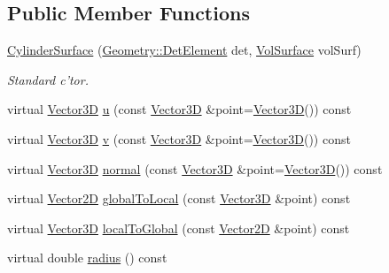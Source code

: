 \subsection*{Public Member Functions}
\begin{DoxyCompactItemize}
\item 
\hyperlink{class_d_d4hep_1_1_d_d_rec_1_1_cylinder_surface_a7820d49bdd82fe0e4c33dfa3953cd73a}{CylinderSurface} (\hyperlink{class_d_d4hep_1_1_geometry_1_1_det_element}{Geometry::DetElement} det, \hyperlink{class_d_d4hep_1_1_d_d_rec_1_1_vol_surface}{VolSurface} volSurf)
\begin{DoxyCompactList}\small\item\em Standard c'tor. \item\end{DoxyCompactList}\item 
virtual \hyperlink{class_d_d_surfaces_1_1_vector3_d}{Vector3D} \hyperlink{class_d_d4hep_1_1_d_d_rec_1_1_cylinder_surface_adb01b4c563ea150f1c2a4d595beca0e6}{u} (const \hyperlink{class_d_d_surfaces_1_1_vector3_d}{Vector3D} \&point=\hyperlink{class_d_d_surfaces_1_1_vector3_d}{Vector3D}()) const 
\item 
virtual \hyperlink{class_d_d_surfaces_1_1_vector3_d}{Vector3D} \hyperlink{class_d_d4hep_1_1_d_d_rec_1_1_cylinder_surface_a8cf924dc19c5eb87e435dd1918e14407}{v} (const \hyperlink{class_d_d_surfaces_1_1_vector3_d}{Vector3D} \&point=\hyperlink{class_d_d_surfaces_1_1_vector3_d}{Vector3D}()) const 
\item 
virtual \hyperlink{class_d_d_surfaces_1_1_vector3_d}{Vector3D} \hyperlink{class_d_d4hep_1_1_d_d_rec_1_1_cylinder_surface_a42de2f110f904bf4d4862bd0b149d49a}{normal} (const \hyperlink{class_d_d_surfaces_1_1_vector3_d}{Vector3D} \&point=\hyperlink{class_d_d_surfaces_1_1_vector3_d}{Vector3D}()) const 
\item 
virtual \hyperlink{class_d_d_surfaces_1_1_vector2_d}{Vector2D} \hyperlink{class_d_d4hep_1_1_d_d_rec_1_1_cylinder_surface_ad5772b2599d37ee4280dc074873aef40}{globalToLocal} (const \hyperlink{class_d_d_surfaces_1_1_vector3_d}{Vector3D} \&point) const 
\item 
virtual \hyperlink{class_d_d_surfaces_1_1_vector3_d}{Vector3D} \hyperlink{class_d_d4hep_1_1_d_d_rec_1_1_cylinder_surface_a175adc46f395f0795e4aad32147516fa}{localToGlobal} (const \hyperlink{class_d_d_surfaces_1_1_vector2_d}{Vector2D} \&point) const 
\item 
virtual double \hyperlink{class_d_d4hep_1_1_d_d_rec_1_1_cylinder_surface_ad07737fba21e42e21d521ce9dba2083b}{radius} () const 

\end{DoxyCompactItemize}
